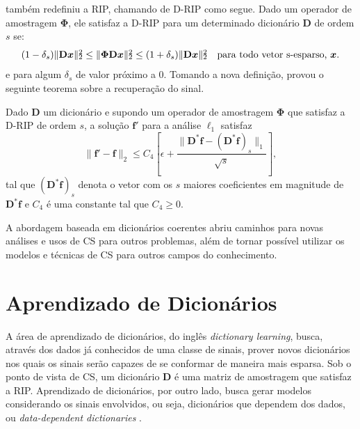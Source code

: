 \documentclass[cic,tc]{iiufrgs}
\def\SPSB#1#2{\rlap{\textsuperscript{#1}}\SB{#2}}
\def\SB#1{\textsubscript{#1}}
\renewcommand{\vec}[1]{\bm{#1}}
\newcommand{\mat}[1]{\bm{#1}}
\begin{document}
\citet{CANDESDICTS} também redefiniu a RIP, chamando de D-RIP como segue. 
Dado um operador de amostragem $\mathbf{\Phi}$, ele satisfaz a D-RIP para um determinado 
dicionário $\mathbf{D}$ de ordem $s$ se:
\begin{equation}
    (1 - \delta_s)\lVert \mathbf{D}\vec{x} \rVert\SPSB{2}{2} \le \lVert \mathbf{\Phi} \mathbf{D}\vec{x} \rVert \SPSB{2}{2} \le 
    (1 + \delta_s)\lVert \mathbf{D}\vec{x} \rVert\SPSB{2}{2} \hspace{1em} \text{para todo vetor s-esparso,  } \vec{x}.
\end{equation}
e para algum $\delta_s$ de valor próximo a 0. %
Tomando a nova definição, \citet{CANDESDICTS} provou o seguinte teorema sobre a recuperação do sinal.
\begin{teorema}
    \cite{CANDESDICTS}
    Dado $\mathbf{D}$ um dicionário e supondo um operador de amostragem $\mathbf{\Phi}$ que satisfaz
    a D-RIP de ordem $s$,
    a solução $\vec{f'}$ para a análise $\ell_1$ satisfaz
    \begin{equation*}
        \lVert \vec{f'} - \vec{f} \rVert_2 \le C_4 \left[ \epsilon + \frac{\lVert \mathbf{D}^* \vec{f} - \left( \mathbf{D}^* \vec{f} \right)_s \rVert_1}{\sqrt{s}} \right],
    \end{equation*}
    tal que $\left( \mathbf{D}^* \vec{f} \right)_s$ denota o vetor com os $s$ maiores coeficientes em 
    magnitude de $\mathbf{D}^* \vec{f}$ e $C_4$ é uma constante tal que $C_4 \ge 0$.
\end{teorema}

A abordagem baseada em dicionários coerentes abriu caminhos para novas análises e usos de CS para outros
problemas, além de tornar possível utilizar os modelos e técnicas de CS
para outros campos do conhecimento.

\section{Aprendizado de Dicionários}
\label{sec:diclearn}
A área de aprendizado de dicionários, do inglês \textit{dictionary learning}, busca, através
dos dados já conhecidos de uma classe de sinais, prover novos dicionários nos quais os sinais 
serão capazes de se conformar de maneira mais esparsa. 
Sob o ponto de vista de CS, um dicionário $\mat{D}$ 
é uma matriz de amostragem que satisfaz a RIP.
Aprendizado de dicionários, por outro lado, busca gerar modelos considerando os sinais envolvidos,
ou seja, dicionários que dependem dos dados, ou \textit{data-dependent dictionaries} \cite{chen2015compressed}.
\end{document}
